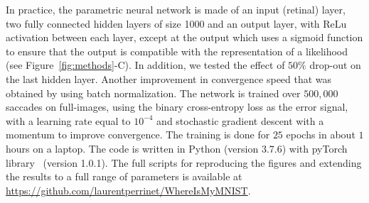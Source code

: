 

In practice, the parametric neural network is made of an input (retinal) layer, two fully connected hidden layers of size 1000
and an output layer, with ReLu activation between each layer, except at the output which uses a sigmoid function to ensure that the output is compatible with the representation of a likelihood (see  Figure~\ref{fig:methods}-C).
In addition, we tested \ICANN
\else the effect of $50 \%$ drop-out on the last hidden layer.
Another \fi improvement in convergence speed that was obtained by using batch normalization. The network is trained over $500,000$ saccades on full-images, using the binary cross-entropy loss as the error signal, with a learning rate equal to $10^{-4}$ and stochastic gradient descent with a momentum to improve convergence. The training is done for $25$ epochs in about $1$ hours on a laptop. The code is written in Python (version 3.7.6) with pyTorch library~\citep{Paszke17} (version 1.0.1). The full scripts for reproducing the figures and extending the results to a full range of parameters is available at \url{https://github.com/laurentperrinet/WhereIsMyMNIST}. %
